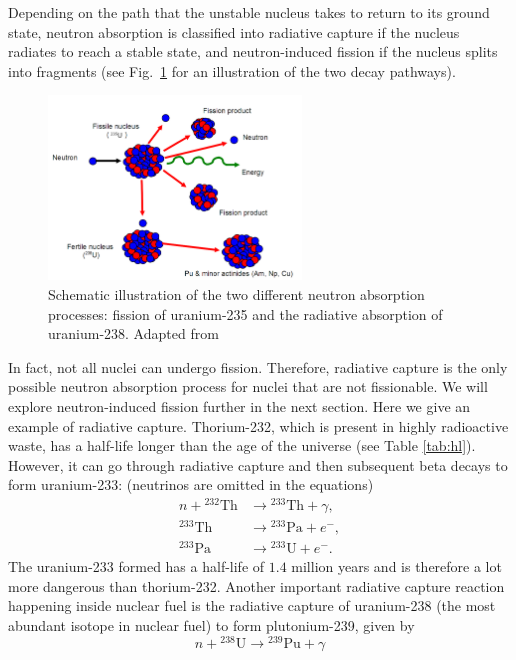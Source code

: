 \documentclass[nofootinbib,preprint,aps]{revtex4-1}
\begin{document}
    Depending on the path that the unstable nucleus takes to return to its ground
    state, neutron absorption is classified into radiative capture if the nucleus radiates to reach a stable
    state, and neutron-induced fission if the nucleus splits into fragments (see Fig.~\ref{fig:both} for an illustration
    of the two decay pathways).
        \begin{figure}
            \centering
            \includegraphics[width=0.6\textwidth]{pu.png}
            \caption{Schematic illustration of the two different neutron absorption processes:
            fission of uranium-235 and the radiative absorption of uranium-238. Adapted from \cite{iync_2013}}
            \label{fig:both}
        \end{figure}
    In fact, not all nuclei can undergo fission.
    Therefore, radiative capture is the only possible neutron absorption process for
    nuclei that are not fissionable.\cite{lb01}
    We will explore neutron-induced fission further in the next section. Here we give an example of radiative capture. Thorium-232, which is present in highly radioactive
    waste, has a half-life longer than the age of the universe (see Table \ref{tab:hl}). However, it can go through
    radiative capture and then subsequent beta decays to form uranium-233: (neutrinos are omitted in the equations)
    \begin{align}
        n + {}^{232}\text{Th} &\rightarrow {}^{233}\text{Th} + \gamma,\\
        {}^{233}\text{Th} &\rightarrow {}^{233}\text{Pa} + e^-,\\
        {}^{233}\text{Pa} &\rightarrow {}^{233}\text{U} + e^-.
    \end{align}
    The uranium-233 formed has a half-life of $1.4$ million years and is therefore a lot more dangerous than
    thorium-232. Another important radiative capture reaction happening inside nuclear fuel is the radiative
    capture of uranium-238 (the most abundant isotope in nuclear fuel) to form plutonium-239, given
    by
    \begin{equation}
        n + {}^{238}\text{U} \rightarrow {}^{239}\text{Pu} + \gamma
    \end{equation}
\end{document}
